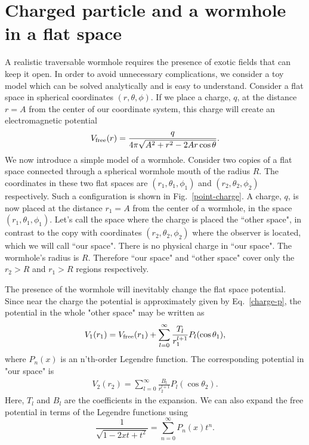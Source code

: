 \documentclass[prd, amsfonts, twocolumn, nofootinbib, showpacs]{revtex4}
\begin{document}
\section{  Charged particle and a wormhole in a flat space}
A realistic traversable wormhole requires the presence of exotic fields that can keep it open. In order to avoid unnecessary complications, we consider a toy model which can be solved analytically and is easy to understand. Consider a flat space in spherical coordinates $(r,\theta, \phi)$. If we place a charge, $q$, at the distance $r=A$ from the center of our coordinate system, this charge will create an electromagnetic potential
\begin{eqnarray}
\label{charge-p}
V_{\rm free}(r)=\frac{q}{4\pi\sqrt{A^2+r^2-2A r\cos\theta}} .
\end{eqnarray}
We now introduce a simple model of a wormhole.
Consider two copies of a flat space connected through a spherical wormhole mouth of the radius $R$. The coordinates in these two flat spaces are $(r_1,\theta_1, \phi_1)$ and $(r_2,\theta_2, \phi_2)$ respectively.
Such a configuration is shown in Fig.~\ref{point-charge}. A charge, $q$, is now placed at the distance $r_1=A$ from the center of a wormhole, in the space $(r_1,\theta_1, \phi_1)$.
Let's call the space where the charge is placed the ``other space", in contrast to the copy with coordinates $(r_2,\theta_2, \phi_2)$ where the observer is located, which we will call ``our space". There is no physical charge in ``our space". The wormhole's radius is $R$. Therefore ``our space" and ``other space" cover only the $r_2>R$ and $r_1>R$ regions respectively.

The presence of the wormhole will inevitably change the flat space potential.  Since near the charge the potential is approximately given by Eq.~\eqref{charge-p}, the potential in the whole "other space" may be written as
\begin{eqnarray}
V_1(r_1)=V_{\rm free}(r_1)+\sum_{l=0}^\infty \frac{T_{l}}{r_1^{l+1}}P_l(\cos\theta_1) ,
\end{eqnarray}
where $P_n(x)$ is an n'th-order Legendre function. The corresponding potential in "our space" is
\begin{eqnarray}
V_2(r_2)=\sum_{l=0}^\infty \frac{B_{l}}{r_2^{l+1}}P_l(\cos\theta_2) .
\end{eqnarray}
Here, $T_l$ and $B_l$ are the coefficients in the expansion.
 We can also expand the free potential in terms of the Legendre functions using
\begin{equation}
\frac{1}{\sqrt{1-2xt+t^2}}=\sum^\infty_{n=0}P_n(x)t^n .
\end{equation}
\end{document}
